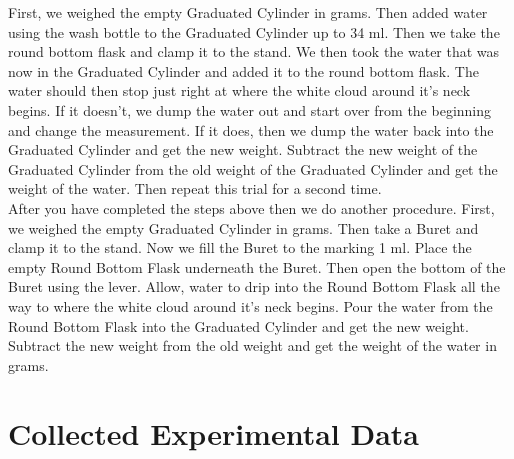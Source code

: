 \documentclass[10pt]{article}
\begin{document}
\hspace{5ex}First, we weighed the empty Graduated Cylinder in grams. Then added water using the wash bottle to the Graduated Cylinder up to 34 ml. Then we take the round bottom flask and clamp it to the stand. We then took the water that was now in the Graduated Cylinder and added it to the round bottom flask. The water should then stop just right at where the white cloud around it's neck begins. If it doesn't, we dump the water out and start over from the beginning and change the measurement. If it does, then we dump the water back into the Graduated Cylinder and get the new weight. Subtract the new weight of the Graduated Cylinder from the old weight of the Graduated Cylinder and get the weight of the water. Then repeat this trial for a second time. \\

\hspace{5ex}After you have completed the steps above then we do another procedure. First, we weighed the empty Graduated Cylinder in grams. Then take a Buret and clamp it to the stand. Now we fill the Buret to the marking 1 ml. Place the empty Round Bottom Flask underneath the Buret. Then open the bottom of the Buret using the lever. Allow, water to drip into the Round Bottom Flask all the way to where the white cloud around it's neck begins. Pour the water from the Round Bottom Flask into the Graduated Cylinder and get the new weight. Subtract the new weight from the old weight and get the weight of the water in grams.\\

\section{Collected Experimental Data}
\begin{table}[H]
	\centering
\caption{Data Collected to Determine the Volume of Unknown Container Using our Procedure (Using Graduated Cylinder)}
\label{Table 1}
\end{table}
\end{document}
